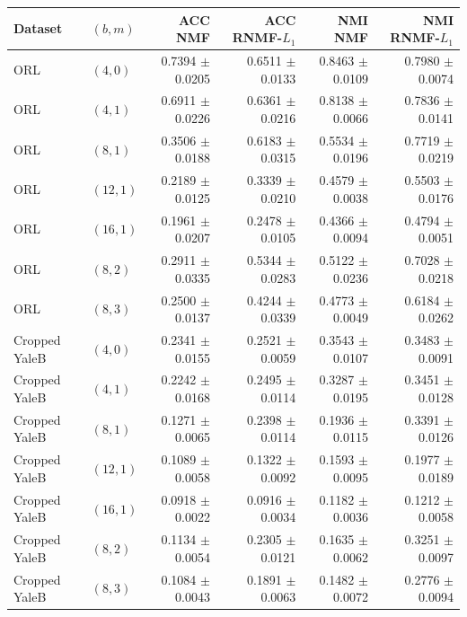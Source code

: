 \begin{tabular}{llrrrr}
\toprule
Dataset & $(b,m)$ & ACC NMF & ACC RNMF-$L_1$ & NMI NMF & NMI RNMF-$L_1$ \\
\midrule
ORL & $(4,0)$  & 0.7394 $\pm$ 0.0205 & 0.6511 $\pm$ 0.0133 & 0.8463 $\pm$ 0.0109 & 0.7980 $\pm$ 0.0074 \\
ORL & $(4,1)$  & 0.6911 $\pm$ 0.0226 & 0.6361 $\pm$ 0.0216 & 0.8138 $\pm$ 0.0066 & 0.7836 $\pm$ 0.0141 \\
ORL & $(8,1)$  & 0.3506 $\pm$ 0.0188 & 0.6183 $\pm$ 0.0315 & 0.5534 $\pm$ 0.0196 & 0.7719 $\pm$ 0.0219 \\
ORL & $(12,1)$ & 0.2189 $\pm$ 0.0125 & 0.3339 $\pm$ 0.0210 & 0.4579 $\pm$ 0.0038 & 0.5503 $\pm$ 0.0176 \\
ORL & $(16,1)$ & 0.1961 $\pm$ 0.0207 & 0.2478 $\pm$ 0.0105 & 0.4366 $\pm$ 0.0094 & 0.4794 $\pm$ 0.0051 \\
ORL & $(8,2)$  & 0.2911 $\pm$ 0.0335 & 0.5344 $\pm$ 0.0283 & 0.5122 $\pm$ 0.0236 & 0.7028 $\pm$ 0.0218 \\
ORL & $(8,3)$  & 0.2500 $\pm$ 0.0137 & 0.4244 $\pm$ 0.0339 & 0.4773 $\pm$ 0.0049 & 0.6184 $\pm$ 0.0262 \\
\midrule
Cropped YaleB & $(4,0)$  & 0.2341 $\pm$ 0.0155 & 0.2521 $\pm$ 0.0059 & 0.3543 $\pm$ 0.0107 & 0.3483 $\pm$ 0.0091 \\
Cropped YaleB & $(4,1)$  & 0.2242 $\pm$ 0.0168 & 0.2495 $\pm$ 0.0114 & 0.3287 $\pm$ 0.0195 & 0.3451 $\pm$ 0.0128 \\
Cropped YaleB & $(8,1)$  & 0.1271 $\pm$ 0.0065 & 0.2398 $\pm$ 0.0114 & 0.1936 $\pm$ 0.0115 & 0.3391 $\pm$ 0.0126 \\
Cropped YaleB & $(12,1)$ & 0.1089 $\pm$ 0.0058 & 0.1322 $\pm$ 0.0092 & 0.1593 $\pm$ 0.0095 & 0.1977 $\pm$ 0.0189 \\
Cropped YaleB & $(16,1)$ & 0.0918 $\pm$ 0.0022 & 0.0916 $\pm$ 0.0034 & 0.1182 $\pm$ 0.0036 & 0.1212 $\pm$ 0.0058 \\
Cropped YaleB & $(8,2)$  & 0.1134 $\pm$ 0.0054 & 0.2305 $\pm$ 0.0121 & 0.1635 $\pm$ 0.0062 & 0.3251 $\pm$ 0.0097 \\
Cropped YaleB & $(8,3)$  & 0.1084 $\pm$ 0.0043 & 0.1891 $\pm$ 0.0063 & 0.1482 $\pm$ 0.0072 & 0.2776 $\pm$ 0.0094 \\
\bottomrule
\end{tabular}

